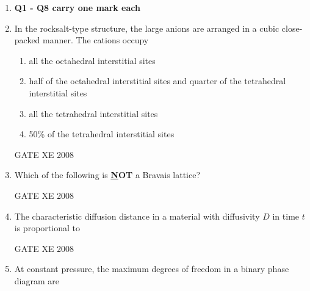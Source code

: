 \documentclass[12pt]{article}
\begin{document}
\begin{enumerate}
\item[] \textbf{Q1 - Q8 carry one mark each}

\item In the rocksalt-type structure, the large anions are arranged in a cubic close-packed manner. The cations occupy

\begin{enumerate}

\item  all the octahedral interstitial sites
\item  half of the octahedral interstitial sites and quarter of the tetrahedral interstitial sites
\item  all the tetrahedral interstitial sites
\item  50\% of the tetrahedral interstitial sites
\end{enumerate}

GATE XE 2008
\item  Which of the following is \textbf{\underline NOT} a Bravais lattice?

\begin{enumerate}
\end{enumerate}

GATE XE 2008
\item The characteristic diffusion distance in a material with diffusivity $D$ in time $t$ is proportional to  

\begin{enumerate}
\end{enumerate}

    GATE XE 2008  
\item At constant pressure, the maximum degrees of freedom in a binary phase diagram are  


\end{enumerate}
\end{document}
